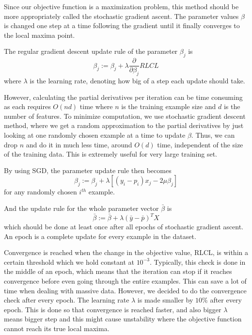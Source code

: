\documentclass{article} %
\begin{document}
Since our objective function is a maximization problem, this method should be more appropriately called the stochastic gradient ascent. The parameter values $\beta$ is changed one step at a time following the gradient until it finally converges to the local maxima point.

The regular gradient descent update rule of the parameter $\beta_j$ is
\begin{equation} \label{eq:update_rule_regular}
\beta_j := \beta_j + \lambda \frac{\partial}{\partial \beta_j} RLCL
\end{equation}
where $\lambda$ is the learning rate, denoting how big of a step each update should take.

However, calculating the partial derivatives per iteration can be time consuming as each requires $O(nd)$ time where $n$ is the training example size and $d$ is the number of features.
To minimize computation, we use stochastic gradient descent method, where we get a random approximation to the partial derivatives by just looking at one randomly chosen example at a time to update $\beta$. Thus, we can drop $n$ and do it in much less time, around $O(d)$ time, independent of the size of the training data. This is extremely useful for very large training set.

By using SGD, the parameter update rule then becomes
\begin{equation} \label{eq:update_rule_stochastic_i}
\beta_j := \beta_j + \lambda [(y_i - p_i)x_j - 2 \mu \beta_j]
\end{equation}
for any randomly chosen $i^{th}$ example.

\noindent And the update rule for the whole parameter vector $\bar{\beta}$ is
\begin{equation} \label{eq:update_rule_stochastic}
\bar{\beta} := \bar{\beta} + \lambda (\bar{y} - \bar{p})^{T}X
\end{equation}
which should be done at least once after all epochs of stochastic gradient ascent. An epoch is a complete update for every example in the dataset.

Convergence is reached when the change in the objective value, RLCL, is within a certain threshold which we hold constant at $10^{-3}$. Typically, this check is done in the middle of an epoch, which means that the iteration can stop if it reaches convergence before even going through the entire examples. This can save a lot of time when dealing with massive data. However, we decided to do the convergence check after every epoch. The learning rate $\lambda$ is made smaller by $10\%$ after every epoch. This is done so that convergence is reached faster, and also bigger $\lambda$ means bigger step and this might cause unstability where the objective function cannot reach its true local maxima.
\end{document}
